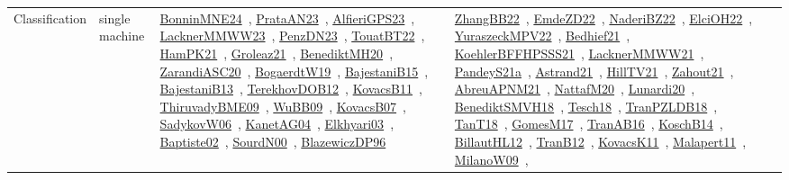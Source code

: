 {\begin{longtable}{lp{3cm}>{\raggedright\arraybackslash}p{6cm}>{\raggedright\arraybackslash}p{6cm}>{\raggedright\arraybackslash}p{8cm}}
Classification & single machine & \href{../works/BonninMNE24.pdf}{BonninMNE24}~\cite{BonninMNE24}, \href{../works/PrataAN23.pdf}{PrataAN23}~\cite{PrataAN23}, \href{../works/AlfieriGPS23.pdf}{AlfieriGPS23}~\cite{AlfieriGPS23}, \href{../works/LacknerMMWW23.pdf}{LacknerMMWW23}~\cite{LacknerMMWW23}, \href{../works/PenzDN23.pdf}{PenzDN23}~\cite{PenzDN23}, \href{../works/TouatBT22.pdf}{TouatBT22}~\cite{TouatBT22}, \href{../works/HamPK21.pdf}{HamPK21}~\cite{HamPK21}, \href{../works/Groleaz21.pdf}{Groleaz21}~\cite{Groleaz21}, \href{../works/BenediktMH20.pdf}{BenediktMH20}~\cite{BenediktMH20}, \href{../works/ZarandiASC20.pdf}{ZarandiASC20}~\cite{ZarandiASC20}, \href{../works/BogaerdtW19.pdf}{BogaerdtW19}~\cite{BogaerdtW19}, \href{../works/BajestaniB15.pdf}{BajestaniB15}~\cite{BajestaniB15}, \href{../works/BajestaniB13.pdf}{BajestaniB13}~\cite{BajestaniB13}, \href{../works/TerekhovDOB12.pdf}{TerekhovDOB12}~\cite{TerekhovDOB12}, \href{../works/KovacsB11.pdf}{KovacsB11}~\cite{KovacsB11}, \href{../works/ThiruvadyBME09.pdf}{ThiruvadyBME09}~\cite{ThiruvadyBME09}, \href{../works/WuBB09.pdf}{WuBB09}~\cite{WuBB09}, \href{../works/KovacsB07.pdf}{KovacsB07}~\cite{KovacsB07}, \href{../works/SadykovW06.pdf}{SadykovW06}~\cite{SadykovW06}, \href{../works/KanetAG04.pdf}{KanetAG04}~\cite{KanetAG04}, \href{../works/Elkhyari03.pdf}{Elkhyari03}~\cite{Elkhyari03}, \href{../works/Baptiste02.pdf}{Baptiste02}~\cite{Baptiste02}, \href{../works/SourdN00.pdf}{SourdN00}~\cite{SourdN00}, \href{../works/BlazewiczDP96.pdf}{BlazewiczDP96}~\cite{BlazewiczDP96} & \href{../works/ZhangBB22.pdf}{ZhangBB22}~\cite{ZhangBB22}, \href{../works/EmdeZD22.pdf}{EmdeZD22}~\cite{EmdeZD22}, \href{../works/NaderiBZ22.pdf}{NaderiBZ22}~\cite{NaderiBZ22}, \href{../works/ElciOH22.pdf}{ElciOH22}~\cite{ElciOH22}, \href{../works/YuraszeckMPV22.pdf}{YuraszeckMPV22}~\cite{YuraszeckMPV22}, \href{../works/Bedhief21.pdf}{Bedhief21}~\cite{Bedhief21}, \href{../works/KoehlerBFFHPSSS21.pdf}{KoehlerBFFHPSSS21}~\cite{KoehlerBFFHPSSS21}, \href{../works/LacknerMMWW21.pdf}{LacknerMMWW21}~\cite{LacknerMMWW21}, \href{../works/PandeyS21a.pdf}{PandeyS21a}~\cite{PandeyS21a}, \href{../works/Astrand21.pdf}{Astrand21}~\cite{Astrand21}, \href{../works/HillTV21.pdf}{HillTV21}~\cite{HillTV21}, \href{../works/Zahout21.pdf}{Zahout21}~\cite{Zahout21}, \href{../works/AbreuAPNM21.pdf}{AbreuAPNM21}~\cite{AbreuAPNM21}, \href{../works/NattafM20.pdf}{NattafM20}~\cite{NattafM20}, \href{../works/Lunardi20.pdf}{Lunardi20}~\cite{Lunardi20}, \href{../works/BenediktSMVH18.pdf}{BenediktSMVH18}~\cite{BenediktSMVH18}, \href{../works/Tesch18.pdf}{Tesch18}~\cite{Tesch18}, \href{../works/TranPZLDB18.pdf}{TranPZLDB18}~\cite{TranPZLDB18}, \href{../works/TanT18.pdf}{TanT18}~\cite{TanT18}, \href{../works/GomesM17.pdf}{GomesM17}~\cite{GomesM17}, \href{../works/TranAB16.pdf}{TranAB16}~\cite{TranAB16}, \href{../works/KoschB14.pdf}{KoschB14}~\cite{KoschB14}, \href{../works/BillautHL12.pdf}{BillautHL12}~\cite{BillautHL12}, \href{../works/TranB12.pdf}{TranB12}~\cite{TranB12}, \href{../works/KovacsK11.pdf}{KovacsK11}~\cite{KovacsK11}, \href{../works/Malapert11.pdf}{Malapert11}~\cite{Malapert11}, \href{../works/MilanoW09.pdf}{MilanoW09}~\cite{MilanoW09}, 
\end{longtable}}
